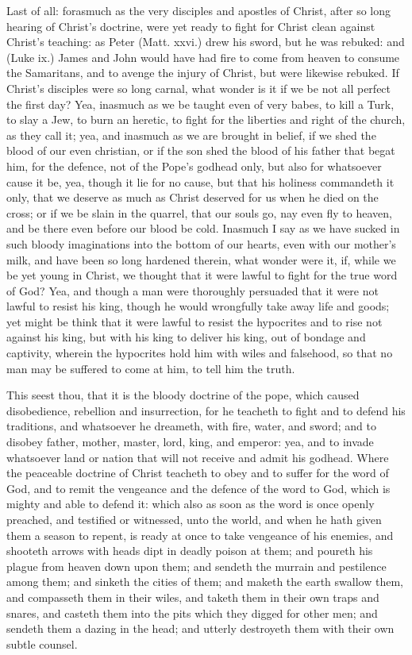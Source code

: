 Last of all: forasmuch as the very disciples and apostles 
of Christ, after so long hearing of Christ's doctrine, were 
yet ready to fight for Christ clean against Christ's teaching:
as Peter (Matt. xxvi.) drew his sword, but he was rebuked:
and (Luke ix.) James and John would have had fire to 
come from heaven to consume the Samaritans, and to 
avenge the injury of Christ, but were likewise rebuked. If 
Christ's disciples were so long carnal, what wonder is it if 
we be not all perfect the first day? Yea, inasmuch as we 
be taught even of very babes, to kill a Turk, to slay a Jew, 
to burn an heretic, to fight for the liberties and right of 
the church, as they call it; yea, and inasmuch as we are 
brought in belief, if we shed the blood of our even christian,
or if the son shed the blood of his father that begat him, 
for the defence, not of the Pope's godhead only, but also 
for whatsoever cause it be, yea, though it lie for no cause, 
but that his holiness commandeth it only, that we deserve 
as much as Christ deserved for us when he died on the 
cross; or if we be slain in the quarrel, that our souls go, 
nay even fly to heaven, and be there even before our blood 
be cold. Inasmuch I say as we have sucked in such bloody 
imaginations into the bottom of our hearts, even with our 
mother's milk, and have been so long hardened therein, 
what wonder were it, if, while we be yet young in Christ, 
we thought that it were lawful to fight for the true word of 
God? Yea, and though a man were thoroughly persuaded 
that it were not lawful to resist his king, though he would 
wrongfully take away life and goods; yet might be think 
that it were lawful to resist the hypocrites and to rise not 
against his king, but with his king to deliver his king, out 
of bondage and captivity, wherein the hypocrites hold him 
with wiles and falsehood, so that no man may be suffered 
to come at him, to tell him the truth. 

This seest thou, that it is the bloody doctrine of the pope, 
which caused disobedience, rebellion and insurrection, for 
he teacheth to fight and to defend his traditions, and whatsoever
he dreameth, with fire, water, and sword; and to disobey
father, mother, master, lord, king, and emperor: yea, 
and to invade whatsoever land or nation that will not receive 
and admit his godhead. Where the peaceable doctrine of 
Christ teacheth to obey and to suffer for the word of God, 
and to remit the vengeance and the defence of the word to 
God, which is mighty and able to defend it: which also as 
soon as the word is once openly preached, and testified or 
witnessed, unto the world, and when he hath given them a 
season to repent, is ready at once to take vengeance of his 
enemies, and shooteth arrows with heads dipt in deadly 
poison at them; and poureth his plague from heaven down 
upon them; and sendeth the murrain and pestilence among 
them; and sinketh the cities of them; and maketh the earth 
swallow them, and compasseth them in their wiles, and 
taketh them in their own traps and snares, and casteth 
them into the pits which they digged for other men; and
sendeth them a dazing in the head; and utterly destroyeth
them with their own subtle counsel.

